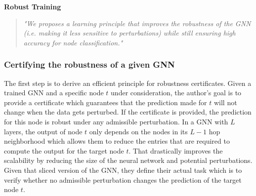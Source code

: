 \documentclass[a4paper,preprint]{sig-alternate}
\begin{document}
\textbf{Robust Training}
\begin{quote}
    \emph{"We proposes a learning principle that improves the robustness of the GNN (i.e. making it less sensitive to perturbations) 
    while still ensuring high accuracy for node classification."} \cite{Zuegner_2019}
\end{quote}

\vfill
\pagebreak

\subsubsection{Certifying the robustness of a given GNN}

The first step is to derive an efficient principle for robustness certificates. Given a trained GNN and a specific node $t$ under consideration,
the author's goal is to provide a certificate which guarantees that the prediction made for $t$ will not change when the data gets perturbed.
If the certificate is provided, the prediction for this node is robust under any admissible perturbation.
In a GNN with $L$ layers, the output of node $t$ only depends on the nodes in its $L-1$ hop neighborhood
which allows them to reduce the entries that are required to compute the output for the target node $t$. That drastically improves the scalability
by reducing the size of the neural network and potential perturbations. Given that sliced version of the GNN, they define their actual
task which is to verify whether no admissible perturbation changes the prediction of the target node $t$.\newline
\end{document}

